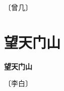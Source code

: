 \documentclass[12pt,UTF-8,openany,fontset=none]{ctexbook}
\begin{document}
\begin{center}
    \vspace{10pt}
    
    \begin{large}
        
        〔曾几〕
        
    \end{large}
    
    \vspace{8pt}
    
    \begin{huge}
        
        \phantom{。}

        \phantom{。}
        
        \phantom{。}

        \phantom{。}
        
    \end{huge}
    
\end{center}

\vspace{8pt}
\clearpage


\section{望天门山}



\begin{center}
    {\bfseries 望天门山}
\end{center}

\begin{center}
    \vspace{10pt}
    
    \begin{large}
        
        〔李白〕
        
    \end{large}
    
    \vspace{8pt}
    
    \begin{huge}
        
        \phantom{。}

        \phantom{。}
        
        \phantom{。}

        \phantom{。}~~
        
    \end{huge}
    
\end{center}
\end{document}
